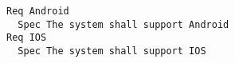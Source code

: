 

\begin{lstlisting}
Req Android
  Spec The system shall support Android
Req IOS
  Spec The system shall support IOS

\end{lstlisting}